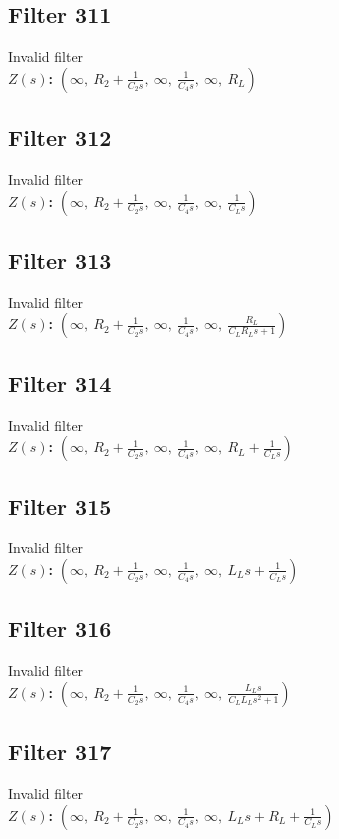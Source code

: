 \documentclass{article}
\begin{document}
\subsection*{Filter 311}
Invalid filter \\ 
\textbf{$Z(s)$:} $\left( \infty, \  R_{2} + \frac{1}{C_{2} s}, \  \infty, \  \frac{1}{C_{4} s}, \  \infty, \  R_{L}\right)$ \\ 
\subsection*{Filter 312}
Invalid filter \\ 
\textbf{$Z(s)$:} $\left( \infty, \  R_{2} + \frac{1}{C_{2} s}, \  \infty, \  \frac{1}{C_{4} s}, \  \infty, \  \frac{1}{C_{L} s}\right)$ \\ 
\subsection*{Filter 313}
Invalid filter \\ 
\textbf{$Z(s)$:} $\left( \infty, \  R_{2} + \frac{1}{C_{2} s}, \  \infty, \  \frac{1}{C_{4} s}, \  \infty, \  \frac{R_{L}}{C_{L} R_{L} s + 1}\right)$ \\ 
\subsection*{Filter 314}
Invalid filter \\ 
\textbf{$Z(s)$:} $\left( \infty, \  R_{2} + \frac{1}{C_{2} s}, \  \infty, \  \frac{1}{C_{4} s}, \  \infty, \  R_{L} + \frac{1}{C_{L} s}\right)$ \\ 
\subsection*{Filter 315}
Invalid filter \\ 
\textbf{$Z(s)$:} $\left( \infty, \  R_{2} + \frac{1}{C_{2} s}, \  \infty, \  \frac{1}{C_{4} s}, \  \infty, \  L_{L} s + \frac{1}{C_{L} s}\right)$ \\ 
\subsection*{Filter 316}
Invalid filter \\ 
\textbf{$Z(s)$:} $\left( \infty, \  R_{2} + \frac{1}{C_{2} s}, \  \infty, \  \frac{1}{C_{4} s}, \  \infty, \  \frac{L_{L} s}{C_{L} L_{L} s^{2} + 1}\right)$ \\ 
\subsection*{Filter 317}
Invalid filter \\ 
\textbf{$Z(s)$:} $\left( \infty, \  R_{2} + \frac{1}{C_{2} s}, \  \infty, \  \frac{1}{C_{4} s}, \  \infty, \  L_{L} s + R_{L} + \frac{1}{C_{L} s}\right)$ \\ 
\end{document}
